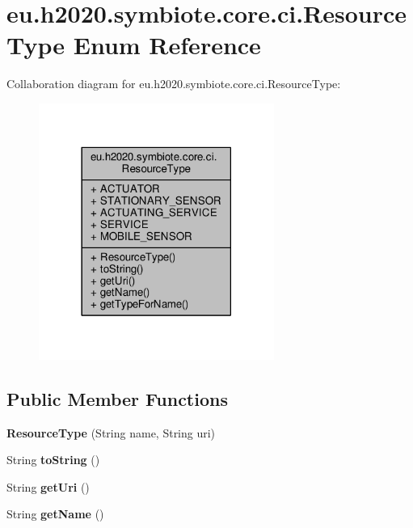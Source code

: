 \hypertarget{enumeu_1_1h2020_1_1symbiote_1_1core_1_1ci_1_1ResourceType}{}\section{eu.\+h2020.\+symbiote.\+core.\+ci.\+Resource\+Type Enum Reference}
\label{enumeu_1_1h2020_1_1symbiote_1_1core_1_1ci_1_1ResourceType}


Collaboration diagram for eu.\+h2020.\+symbiote.\+core.\+ci.\+Resource\+Type\+:\nopagebreak
\begin{figure}[H]
\begin{center}
\leavevmode
\includegraphics[width=218pt]{enumeu_1_1h2020_1_1symbiote_1_1core_1_1ci_1_1ResourceType__coll__graph}
\end{center}
\end{figure}
\subsection*{Public Member Functions}
\begin{DoxyCompactItemize}
\item 
\mbox{\label{enumeu_1_1h2020_1_1symbiote_1_1core_1_1ci_1_1ResourceType_a9605a2b4e43ce9068c3e1b802af6340e}} 
{\bfseries Resource\+Type} (String name, String uri)
\item 
\mbox{\label{enumeu_1_1h2020_1_1symbiote_1_1core_1_1ci_1_1ResourceType_ae655213ea7417d3c094fcf177b9985eb}} 
String {\bfseries to\+String} ()
\item 
\mbox{\label{enumeu_1_1h2020_1_1symbiote_1_1core_1_1ci_1_1ResourceType_a73ff060113a7e4d0534c1b55f3322493}} 
String {\bfseries get\+Uri} ()
\item 
\mbox{\label{enumeu_1_1h2020_1_1symbiote_1_1core_1_1ci_1_1ResourceType_abc6306cfecfa44edbf2e029847c3f189}} 
String {\bfseries get\+Name} ()
\end{DoxyCompactItemize}
